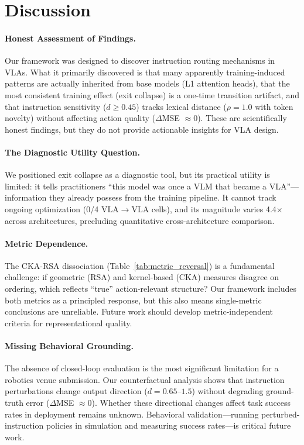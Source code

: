 \documentclass[letterpaper]{article}
\begin{document}
\section{Discussion}

\paragraph{Honest Assessment of Findings.}
Our framework was designed to discover instruction routing mechanisms in VLAs. What it primarily discovered is that many apparently training-induced patterns are actually inherited from base models (L1 attention heads), that the most consistent training effect (exit collapse) is a one-time transition artifact, and that instruction sensitivity ($d \geq 0.45$) tracks lexical distance ($\rho = 1.0$ with token novelty) without affecting action quality ($\Delta$MSE $\approx 0$). These are scientifically honest findings, but they do not provide actionable insights for VLA design.

\paragraph{The Diagnostic Utility Question.}
We positioned exit collapse as a diagnostic tool, but its practical utility is limited: it tells practitioners ``this model was once a VLM that became a VLA''---information they already possess from the training pipeline. It cannot track ongoing optimization (0/4 VLA$\to$VLA cells), and its magnitude varies 4.4$\times$ across architectures, precluding quantitative cross-architecture comparison.

\paragraph{Metric Dependence.}
The CKA-RSA dissociation (Table~\ref{tab:metric_reversal}) is a fundamental challenge: if geometric (RSA) and kernel-based (CKA) measures disagree on ordering, which reflects ``true'' action-relevant structure? Our framework includes both metrics as a principled response, but this also means single-metric conclusions are unreliable. Future work should develop metric-independent criteria for representational quality.

\paragraph{Missing Behavioral Grounding.}
The absence of closed-loop evaluation is the most significant limitation for a robotics venue submission. Our counterfactual analysis shows that instruction perturbations change output direction ($d = 0.65$--$1.5$) without degrading ground-truth error ($\Delta$MSE $\approx 0$). Whether these directional changes affect task success rates in deployment remains unknown. Behavioral validation---running perturbed-instruction policies in simulation and measuring success rates---is critical future work.
\end{document}
